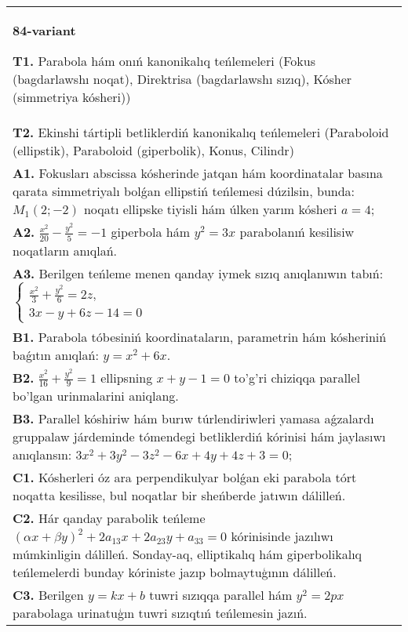 \documentclass{article}
\begin{document}
\begin{tabular}{m{17cm}}
\textbf{84-variant}
\newline

\textbf{T1.} Parabola hám onıń kanonikalıq teńlemeleri (Fokus (bagdarlawshı noqat), Direktrisa (bagdarlawshı sızıq), Kósher (simmetriya kósheri)) \\
\textbf{T2.} Ekinshi tártipli betliklerdiń kanonikalıq teńlemeleri (Paraboloid (ellipstik), Paraboloid (giperbolik), Konus, Cilindr) \\
\textbf{A1.} Fokusları abscissa kósherinde jatqan hám koordinatalar basına qarata simmetriyalı bolǵan ellipstiń teńlemesi dúzilsin, bunda: $M_1 (2;-2) $ noqatı ellipske tiyisli hám úlken yarım kósheri $a=4$; \\
\textbf{A2.} $\frac{x^2}{20}-\frac{y^2}{5}=-1$ giperbola hám $y^2=3 x$ parabolanıń kesilisiw noqatların anıqlań. \\
\textbf{A3.} Berilgen teńleme menen qanday iymek sızıq anıqlanıwın tabıń: $\left\{\begin{array}{l}\frac{x^2}{3}+\frac{y^2}{6}=2 z, \\ 3 x-y+6 z-14=0\end{array}\right.$ \\
\textbf{B1.} Parabola tóbesiniń koordinataların, parametrin hám kósheriniń baǵıtın anıqlań: $y=x^2+6 x$. \\
\textbf{B2.} $\frac{x^2}{16}+\frac{y^2}{9}=1$ ellipsning $x+y-1=0$ to'g'ri chiziqqa parallel bo'lgan urinmalarini aniqlang. \\
\textbf{B3.} Parallel kóshiriw hám burıw túrlendiriwleri yamasa aǵzalardı gruppalaw járdeminde tómendegi betliklerdiń kórinisi hám jaylasıwı anıqlansın: $3 x^2+3 y^2-3 z^2-6 x+4 y+4 z+3=0$; \\
\textbf{C1.} Kósherleri óz ara perpendikulyar bolǵan eki parabola tórt noqatta kesilisse, bul noqatlar bir sheńberde jatıwın dálilleń. \\
\textbf{C2.} Hár qanday parabolik teńleme $ (\alpha x+\beta y) ^2+2a_{13}x+2a_{23}y+a_{33}=0$ kórinisinde jazılıwı múmkinligin dálilleń. Sonday-aq, elliptikalıq hám giperbolikalıq teńlemelerdi bunday kóriniste jazıp bolmaytuģının dálilleń. \\
\textbf{C3.} Berilgen $y=k x+b$ tuwri sızıqqa parallel hám $y^2=2 p x$ parabolaga urinatuģın tuwri sızıqtıń teńlemesin jazıń. \\

\end{tabular}
\vspace{1cm}
\end{document}
